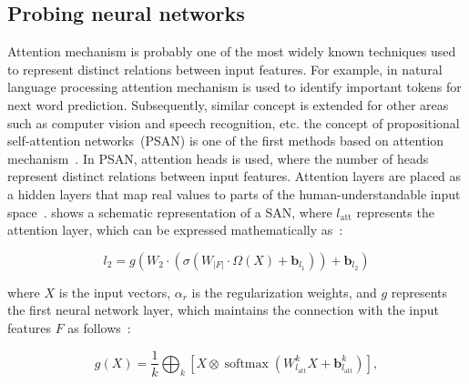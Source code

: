 \subsection{Probing neural networks}
Attention mechanism is probably one of the most widely known techniques used to represent distinct relations between input features. For example, in natural language processing attention mechanism is used to identify important tokens for next word prediction. Subsequently, similar concept is extended for other areas such as computer vision and speech recognition, etc.%
the concept of propositional self-attention networks~(PSAN) is one of the first methods based on attention mechanism~\cite{vaswani2017attention}. In PSAN, attention heads is used, where the number of heads represent distinct relations between input features. Attention layers are placed as a hidden layers that map real values to parts of the human-understandable input space~\cite{vskrlj2020feature}. 
 shows a schematic representation of a SAN, where $l_{\text {att}}$ represents the attention layer, which can be expressed mathematically as~\cite{vskrlj2020feature}:  

\begin{equation}
    l_{2}=g\left(W_{2} \cdot\left(\sigma \left(W_{|F|} \cdot \Omega(X)+\boldsymbol{b}_{l_{1}}\right)\right)+\boldsymbol{b}_{l_{2}}\right)
\end{equation}

\hspace*{3.5mm} where $X$ is the input vectors, $\alpha_r$ is the regularization weights, and $g$ represents the first neural network layer, which maintains the connection with the input features $F$ as follows~\cite{vskrlj2020feature}: 

\begin{equation}
    g(X)=\frac{1}{k} \bigoplus_{k}\left[X \otimes \operatorname{softmax}\left(W_{l_{\mathrm{att}}}^{k} X+\boldsymbol{b}_{l_{\mathrm{att}}}^{k}\right)\right],
\end{equation}

